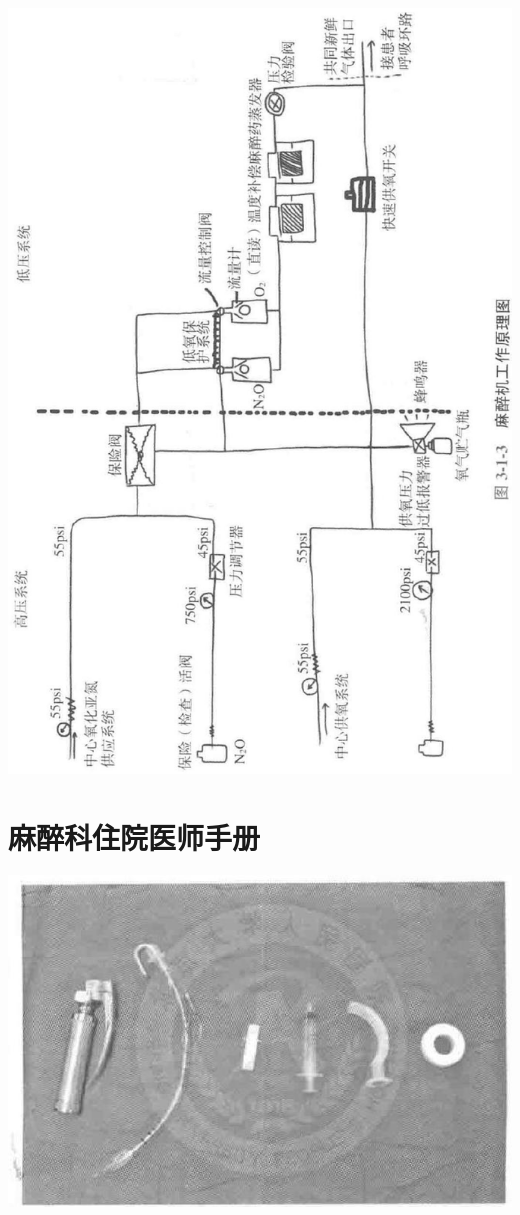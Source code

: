 \documentclass[10pt]{article}
\begin{document}
\begin{center}
\includegraphics[max width=\textwidth]{2024_07_05_645bb794a4d4f32ee0c8g-071}
\end{center}

\section*{麻醉科住院医师手册}
\begin{center}
\includegraphics[max width=\textwidth]{2024_07_05_645bb794a4d4f32ee0c8g-072(1)}
\end{center}
\end{document}
